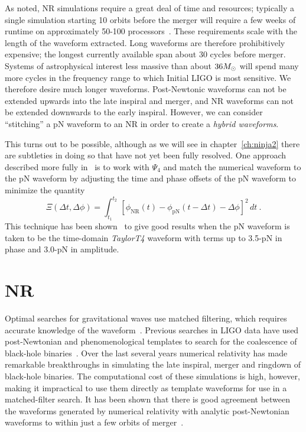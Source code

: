 As noted, NR simulations require a great deal of time and resources;
typically a single simulation starting 10 orbits before the merger
will require a few weeks of runtime on approximately 50-100
processors~.  These requirements scale with the
length of the waveform extracted.  Long waveforms are therefore
prohibitively expensive; the longest currently available span about 30
cycles before merger.  Systems of astrophysical interest less massive
than about $36 M_\odot$ will spend many more cycles in the frequency
range to which Initial LIGO is most sensitive.  We therefore desire
much longer waveforms.  Post-Newtonic waveforms can not be extended
upwards into the late inspiral and merger, and NR waveforms can not be
extended downwards to the early inspiral.  However, we can consider
``stitching'' a pN waveform to an NR in order to create a \emph{hybrid
waveforms}.

This turns out to be possible, although as we will see in
chapter~\ref{ch:ninja2} there are subtleties in doing so that have not
yet been fully resolved.  One approach described more fully
in~\cite{Boyle2008a} is to work with $\Psi_4$ and match the numerical
waveform to the pN waveform by adjusting the time and phase offsets of
the pN waveform to minimize the quantity
%
\begin{equation}
  \label{eq:MatchingChiSquared}
  \Xi(\Delta t, \Delta \phi) = \int_{t_{1}}^{t_{2}}\, \left[
    \phi_{\mathrm{NR}}(t) - \phi_{\mathrm{pN}}(t - \Delta t) - \Delta \phi
  \right]^{2}\, d t \ .
\end{equation}
%
This technique has been shown~\cite{Boyle2007} to give good results
when the pN waveform is taken to be the time-domain \textit{TaylorT4}
waveform with terms up to 3.5-pN in phase and 3.0-pN in amplitude.


\iffalse

\section{NR}
\label{sec:NR}

Optimal searches for gravitational waves use matched filtering, which
requires accurate knowledge of the waveform~\cite{thorne.k:1987}.
Previous searches in LIGO data have used post-Newtonian and
phenomenological templates to search for the coalescence of black-hole
binaries~\cite{Abbott:2005pf,Abbott:2007xi,Abbott:2008}. Over the last
several years numerical relativity has made remarkable breakthroughs
in simulating the late inspiral, merger and ringdown of black-hole
binaries. The computational cost of these simulations is high,
however, making it impractical to use them directly as template
waveforms for use in a matched-filter search. It has been shown that
there is good agreement between the waveforms generated by numerical
relativity with analytic post-Newtonian waveforms to within just a few
orbits of merger~\cite{Buonanno-Cook-Pretorius:2007, Baker2006d,
  Pan2007, Buonanno2007, Hannam2007, Boyle2007, Gopakumar:2007vh,
  Hannam2007c, Boyle2008a, Mroue2008, Hinder2008b}.


